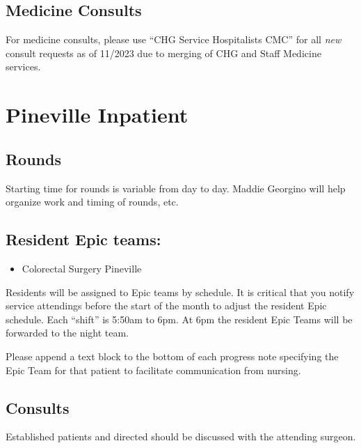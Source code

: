\documentclass[
]{book}
\providecommand{\tightlist}{%
  \setlength{\itemsep}{0pt}\setlength{\parskip}{0pt}}
\begin{document}
\hypertarget{medicine-consults}{%
\section{Medicine Consults}\label{medicine-consults}}

For medicine consults, please use ``CHG Service Hospitalists CMC'' for all \emph{new} consult requests as of 11/2023 due to merging of CHG and Staff Medicine services.

\hypertarget{pineville-inpatient}{%
\chapter{Pineville Inpatient}\label{pineville-inpatient}}

\hypertarget{rounds-1}{%
\section{Rounds}\label{rounds-1}}

Starting time for rounds is variable from day to day. Maddie Georgino will help organize work and timing of rounds, etc.

\hypertarget{resident-epic-teams-1}{%
\section{Resident Epic teams:}\label{resident-epic-teams-1}}

\begin{itemize}
\tightlist
\item
  Colorectal Surgery Pineville
\end{itemize}

Residents will be assigned to Epic teams by schedule. It is critical that you notify service attendings before the start of the month to adjust the resident Epic schedule. Each ``shift'' is 5:50am to 6pm. At 6pm the resident Epic Teams will be forwarded to the night team.

Please append a text block to the bottom of each progress note specifying the Epic Team for that patient to facilitate communication from nursing.

\hypertarget{consults-1}{%
\section{Consults}\label{consults-1}}

Established patients and directed should be discussed with the attending surgeon.
\end{document}
